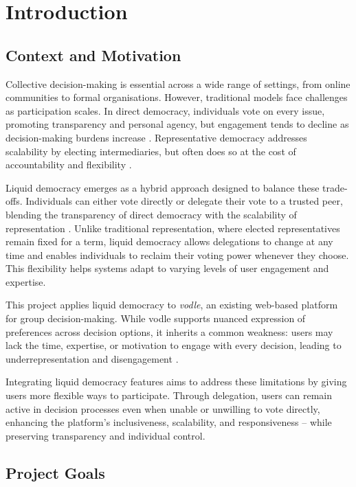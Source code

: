 \chapter{Introduction}\label{ch:introduction}

\section{Context and Motivation}

Collective decision-making is essential across a wide range of settings, from online communities to formal organisations. However, traditional models face challenges as participation scales. In direct democracy, individuals vote on every issue, promoting transparency and personal agency, but engagement tends to decline as decision-making burdens increase \citep{ford_delegative_2002}. Representative democracy addresses scalability by electing intermediaries, but often does so at the cost of accountability and flexibility \citep{blum_liquid_2016}.

Liquid democracy emerges as a hybrid approach designed to balance these trade-offs. Individuals can either vote directly or delegate their vote to a trusted peer, blending the transparency of direct democracy with the scalability of representation \citep{ford_delegative_2002, blum_liquid_2016}. Unlike traditional representation, where elected representatives remain fixed for a term, liquid democracy allows delegations to change at any time and enables individuals to reclaim their voting power whenever they choose. This flexibility helps systems adapt to varying levels of user engagement and expertise.

This project applies liquid democracy to \textit{vodle}, an existing web-based platform for group decision-making. While vodle supports nuanced expression of preferences across decision options, it inherits a common weakness: users may lack the time, expertise, or motivation to engage with every decision, leading to underrepresentation and disengagement \citep{ford_delegative_2002, blum_liquid_2016}.

Integrating liquid democracy features aims to address these limitations by giving users more flexible ways to participate. Through delegation, users can remain active in decision processes even when unable or unwilling to vote directly, enhancing the platform's inclusiveness, scalability, and responsiveness -- while preserving transparency and individual control.

\section{Project Goals}

